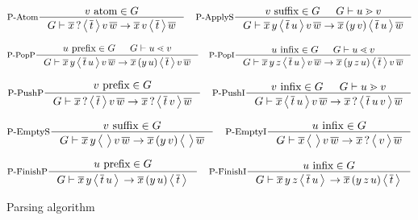 \documentclass{article}
\begin{document}
\begin{figure}
  \[
  \inference[P-Atom]
    {\hasfix{v}{\atom}{G}}
    {\sstep{G}
      {\qstate{\seq{x}}{\seq{t}}{v\,\seq{w}}}
      {\state{\seq{x}\,v}{\seq{t}}{\seq{w}}}}
  \quad
  \inference[P-ApplyS]
    {\hasfix{v}{\suffix{}{}}{G} & \sgd{G}{u}{v}}
    {\sstep{G}
      {\state{\seq{x}\,y}{\seq{t}\,u}{v\,\seq{w}}}
      {\state{\seq{x}\,(y\,v)}{\seq{t}\,u}{\seq{w}}}}
  \]

  \[
  \inference[P-PopP]
    {\hasfix{u}{\prefix{}{}}{G} & \sld{G}{u}{v}}
    {\sstep{G}
      {\state{\seq{x}\,y}{\seq{t}\,u}{v\,\seq{w}}}
      {\state{\seq{x}\,(y\,u)}{\seq{t}}{v\,\seq{w}}}}
  \quad
  \inference[P-PopI]
    {\hasfix{u}{\infix{}{}}{G} & \sld{G}{u}{v}}
    {\sstep{G}
      {\state{\seq{x}\,y\,z}{\seq{t}\,u}{v\,\seq{w}}}
      {\state{\seq{x}\,(y\,z\,u)}{\seq{t}}{v\,\seq{w}}}}
  \]

  \[
  \inference[P-PushP]
    {\hasfix{v}{\prefix{}{}}{G}}
    {\sstep{G}
      {\qstate{\seq{x}}{\seq{t}}{v\,\seq{w}}}
      {\qstate{\seq{x}}{\seq{t}\,v}{\seq{w}}}}
  \quad
  \inference[P-PushI]
    {\hasfix{v}{\infix{}{}}{G} & \sgd{G}{u}{v}}
    {\sstep{G}
      {\state{\seq{x}}{\seq{t}\,u}{v\,\seq{w}}}
      {\qstate{\seq{x}}{\seq{t}\,u\,v}{\seq{w}}}}
  \]

  \[
  \inference[P-EmptyS]
    {\hasfix{v}{\suffix{}{}}{G}}
    {\sstep{G}
      {\state{\seq{x}\,y}{}{v\,\seq{w}}}
      {\state{\seq{x}\,(y\,v)}{}{\seq{w}}}}
  \quad
  \inference[P-EmptyI]
    {\hasfix{u}{\infix{}{}}{G}}
    {\sstep{G}
      {\state{\seq{x}}{}{v\,\seq{w}}}
      {\qstate{\seq{x}}{v}{\seq{w}}}}
  \]

  \[
  \inference[P-FinishP]
    {\hasfix{u}{\prefix{}{}}{G}}
    {\sstep{G}
      {\state{\seq{x}\,y}{\seq{t}\,u}{}}
      {\state{\seq{x}\,(y\,u)}{\seq{t}}{}}}
  \quad
  \inference[P-FinishI]
    {\hasfix{u}{\infix{}{}}{G}}
    {\sstep{G}
      {\state{\seq{x}\,y\,z}{\seq{t}\,u}{}}
      {\state{\seq{x}\,(y\,z\,u)}{\seq{t}}{}}}
  \]

  \caption{Parsing algorithm}
\end{figure}
\end{document}
